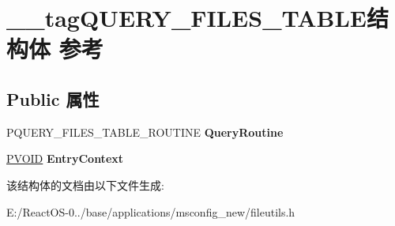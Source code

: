 \hypertarget{struct____tag_q_u_e_r_y___f_i_l_e_s___t_a_b_l_e}{}\section{\+\_\+\+\_\+tag\+Q\+U\+E\+R\+Y\+\_\+\+F\+I\+L\+E\+S\+\_\+\+T\+A\+B\+L\+E结构体 参考}
\label{struct____tag_q_u_e_r_y___f_i_l_e_s___t_a_b_l_e}
\subsection*{Public 属性}
\begin{DoxyCompactItemize}
\item 
\mbox{\label{struct____tag_q_u_e_r_y___f_i_l_e_s___t_a_b_l_e_a512ce52d361cc739998a25e508d977a0}} 
P\+Q\+U\+E\+R\+Y\+\_\+\+F\+I\+L\+E\+S\+\_\+\+T\+A\+B\+L\+E\+\_\+\+R\+O\+U\+T\+I\+NE {\bfseries Query\+Routine}
\item 
\mbox{\label{struct____tag_q_u_e_r_y___f_i_l_e_s___t_a_b_l_e_acab23a2139238b35f9ef6021f4fb5ba5}} 
\hyperlink{interfacevoid}{P\+V\+O\+ID} {\bfseries Entry\+Context}
\end{DoxyCompactItemize}


该结构体的文档由以下文件生成\+:\begin{DoxyCompactItemize}
\item 
E\+:/\+React\+O\+S-\/0../base/applications/msconfig\+\_\+new/fileutils.\+h\end{DoxyCompactItemize}
